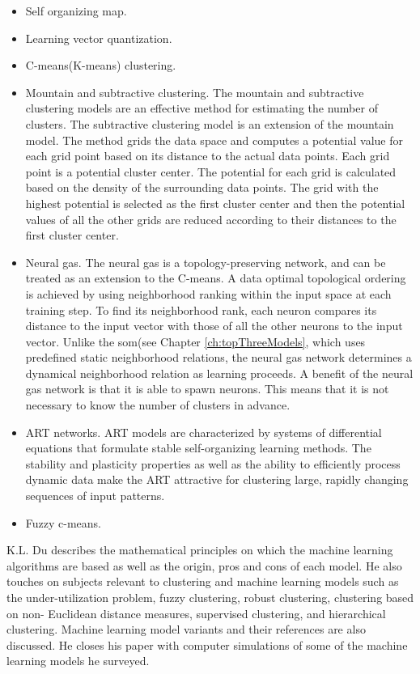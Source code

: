 \documentclass[../main]{subfiles}
\begin{document}
\begin{itemize}
    \item Self organizing map.
    \item Learning vector quantization.
    \item C-means(K-means) clustering.
    \item Mountain and subtractive clustering.
    The mountain and subtractive clustering models are an effective method for estimating the number of clusters\cite{Du2010Clustering:Approach}. 
The subtractive clustering model is an extension of the mountain model\cite{Du2010Clustering:Approach}. 
\newline
The method grids the data space and computes a potential value for each grid point based on its distance to the actual data points. Each grid point is a potential cluster center. 
The potential for each grid is calculated based on the density of the surrounding data points. 
The grid with the highest potential is selected as the first cluster center and then the potential values of all the other grids are reduced according to their distances to the first cluster center.
    \item Neural gas.
    The neural gas is a topology-preserving network, and can be treated as an extension to the C-means\cite{Du2010Clustering:Approach}.
A data optimal topological ordering is achieved by using neighborhood ranking within the input space at each training step\cite{Du2010Clustering:Approach}.
To find its neighborhood rank, each neuron compares its distance to the input vector with those of all the other neurons to the input vector\cite{Du2010Clustering:Approach}. 
Unlike the \acrlong{som}(see Chapter \ref{ch:topThreeModels}, which uses predefined static neighborhood relations, the neural gas network determines a dynamical neighborhood relation as learning proceeds\cite{Du2010Clustering:Approach}.
A benefit of the neural gas network is that it is able to spawn neurons.
This means that it is not necessary to know the number of clusters in advance.
    \item ART networks.
    ART models are characterized by systems of differential equations that formulate stable self-organizing learning methods\cite{Du2010Clustering:Approach}.
The stability and plasticity properties as well as the ability to efficiently process dynamic data make the ART attractive for clustering large, rapidly changing sequences of input patterns\cite{Du2010Clustering:Approach}.
    \item Fuzzy c-means.
\end{itemize}
K.L. Du describes the mathematical principles on which the machine learning algorithms are based as well as the origin, pros and cons of each model.
\newline
He also touches on subjects relevant to clustering and machine learning models such as the under-utilization problem, fuzzy clustering, robust clustering, clustering based on non- Euclidean distance measures, supervised clustering, and hierarchical clustering.
Machine learning model variants and their references are also discussed.
\newline
He closes his paper with computer simulations of some of the machine learning models he surveyed.
\end{document}
